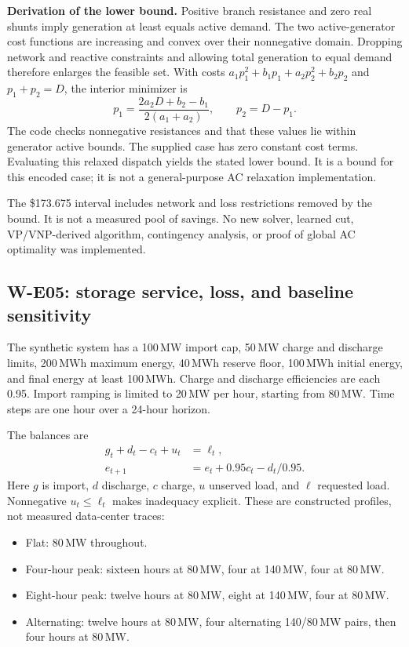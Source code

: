 \documentclass[11pt,letterpaper]{article}
\begin{document}
\textbf{Derivation of the lower bound.} Positive branch resistance and zero real shunts imply generation at least equals active demand. The two active-generator cost functions are increasing and convex over their nonnegative domain. Dropping network and reactive constraints and allowing total generation to equal demand therefore enlarges the feasible set. With costs $a_1p_1^2+b_1p_1+a_2p_2^2+b_2p_2$ and $p_1+p_2=D$, the interior minimizer is
\[
 p_1=\frac{2a_2D+b_2-b_1}{2(a_1+a_2)},\qquad p_2=D-p_1.
\]
The code checks nonnegative resistances and that these values lie within generator active bounds. The supplied case has zero constant cost terms. Evaluating this relaxed dispatch yields the stated lower bound. It is a bound for this encoded case; it is not a general-purpose AC relaxation implementation.

The \$173.675 interval includes network and loss restrictions removed by the bound. It is not a measured pool of savings. No new solver, learned cut, VP/VNP-derived algorithm, contingency analysis, or proof of global AC optimality was implemented.

\subsection{W-E05: storage service, loss, and baseline sensitivity}
The synthetic system has a 100\,MW import cap, 50\,MW charge and discharge limits, 200\,MWh maximum energy, 40\,MWh reserve floor, 100\,MWh initial energy, and final energy at least 100\,MWh. Charge and discharge efficiencies are each 0.95. Import ramping is limited to 20\,MW per hour, starting from 80\,MW. Time steps are one hour over a 24-hour horizon.

The balances are
\begin{align}
 g_t+d_t-c_t+u_t&=\ell_t,\\
 e_{t+1}&=e_t+0.95c_t-d_t/0.95.
\end{align}
Here $g$ is import, $d$ discharge, $c$ charge, $u$ unserved load, and $\ell$ requested load. Nonnegative $u_t\le\ell_t$ makes inadequacy explicit. These are constructed profiles, not measured data-center traces:
\begin{itemize}
\item Flat: 80\,MW throughout.
\item Four-hour peak: sixteen hours at 80\,MW, four at 140\,MW, four at 80\,MW.
\item Eight-hour peak: twelve hours at 80\,MW, eight at 140\,MW, four at 80\,MW.
\item Alternating: twelve hours at 80\,MW, four alternating 140/80\,MW pairs, then four hours at 80\,MW.
\end{itemize}
\end{document}
